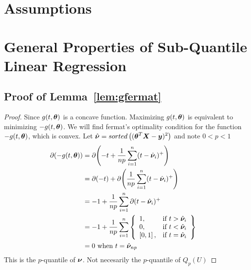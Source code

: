 \documentclass{article} %
\begin{document}
	\begin{appendices}
		
	\newpage
	\appendix
	\startcontents[sections]
	\newpage
	\section{Assumptions}
	\section{General Properties of Sub-Quantile Linear Regression}
	\subsection{Proof of Lemma~\ref{lem:gfermat}}
	\label{app:gfermat}
	\begin{proof}
		Since $\displaystyle g(t,{\bm{\theta}})$ is a concave function. Maximizing $g(t,{\bm{\theta}})$ is equivalent to minimizing $-g(t,{\bm{\theta}})$. We will find fermat's optimality condition for the function $\displaystyle -g(t,{\bm{\theta}})$, which is convex. 
		Let $\displaystyle \hat{{\bm{\nu}}} = sorted\left(({\bm{\theta}}^T{\bm{X}} - {\bm{y}})^2\right)$ and note $\displaystyle 0 < p < 1$
		\begin{align}
			\partial{\displaystyle (-g(t,\boldsymbol{\theta}})) &= \partial{\left(-t + \frac{1}{np}\sum_{i=1}^{n}(t-\hat{{\bm{\nu}}}_i)^+\right)} &&\\
			&= \partial{(-t)} + \partial{\left(\frac{1}{np}\sum_{i=1}^{n}(t-\hat{{\bm{\nu}}}_i)^+\right)}&&\\
			&= -1 + \frac{1}{np}\sum_{i=1}^{n}\partial{(t-\hat{{\bm{\nu}}}_i)^+} &&\\
			&= -1 + \frac{1}{np}\sum_{i=1}^{n}
			\left\{
			\begin{array}{lr}
				1, & \text{if } t > \hat{{\bm{\nu}}}_i\\
				0, & \text{if } t < \hat{{\bm{\nu}}}_i \\
				\left[0,1\right], & \text{if } t = \hat{{\bm{\nu}}}_i \\
			\end{array}
			\right\}&&\\
			&= 0 \text{ when }\displaystyle t = \hat{{\bm{\nu}}}_{np}&&
		\end{align}
		This is the $p$-quantile of $\displaystyle {\bm{\nu}}$. Not necesarily the $p$-quantile of $Q_p(U)$
	\end{proof}


\end{appendices}
\end{document}
